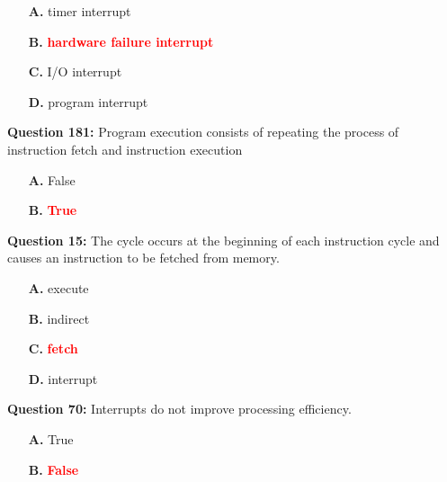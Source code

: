 \documentclass[12pt,a4paper]{article}
\begin{document}
\begin{itemize}
    \item[\textbf{A.}] timer interrupt
    \item[\textbf{B.}] \textcolor{red}{\textbf{hardware failure interrupt}}
    \item[\textbf{C.}] I/O interrupt
    \item[\textbf{D.}] program interrupt
\end{itemize}

\vspace{0.5cm}

\vspace{0.5cm}

\textbf{Question 181:} Program execution consists of repeating the process of instruction fetch and instruction execution

\begin{itemize}
    \item[\textbf{A.}] False
    \item[\textbf{B.}] \textcolor{red}{\textbf{True}}
\end{itemize}

\vspace{0.5cm}

\vspace{0.5cm}

\textbf{Question 15:} The \underline{\hspace{1.5cm}} cycle occurs at the beginning of each instruction cycle and causes an instruction to be fetched from memory.

\begin{itemize}
    \item[\textbf{A.}] execute
    \item[\textbf{B.}] indirect
    \item[\textbf{C.}] \textcolor{red}{\textbf{fetch}}
    \item[\textbf{D.}] interrupt
\end{itemize}

\vspace{0.5cm}

\vspace{0.5cm}

\textbf{Question 70:} Interrupts do not improve processing efficiency.

\begin{itemize}
    \item[\textbf{A.}] True
    \item[\textbf{B.}] \textcolor{red}{\textbf{False}}
\end{itemize}
\end{document}

